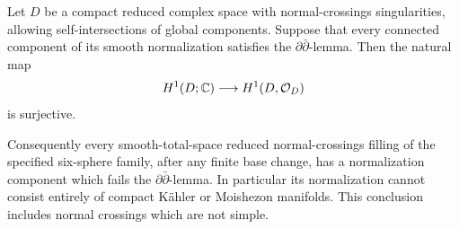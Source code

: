 \begin{theorem}
Let $D$ be a compact reduced complex space with normal-crossings
singularities, allowing self-intersections of global components.
Suppose that every connected component of its smooth normalization
satisfies the $\partial\bar\partial$-lemma. Then the natural map
\[
 H^1(D;\mathbb C)\longrightarrow H^1(D,\mathcal O_D)
\]
is surjective.

Consequently every smooth-total-space reduced normal-crossings
filling of the specified six-sphere family, after any finite base
change, has a normalization component which fails the
$\partial\bar\partial$-lemma. In particular its normalization
cannot consist entirely of compact K\"ahler or Moishezon manifolds.
This conclusion includes normal crossings which are not simple.
\end{theorem}
